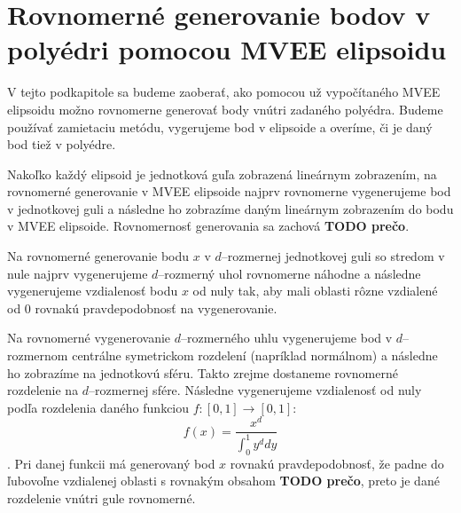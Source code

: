 \section {Rovnomerné generovanie bodov v polyédri pomocou MVEE elipsoidu}

V tejto podkapitole sa budeme zaoberať, ako pomocou už vypočítaného MVEE elipsoidu možno rovnomerne generovať body vnútri zadaného polyédra. Budeme používať zamietaciu metódu, vygerujeme bod v elipsoide a overíme, či je daný bod tiež v polyédre.

Nakoľko každý elipsoid je jednotková guľa zobrazená lineárnym zobrazením, na rovnomerné generovanie v MVEE elipsoide najprv rovnomerne vygenerujeme bod v jednotkovej guli a následne ho zobrazíme daným lineárnym zobrazením do bodu v MVEE elipsoide. Rovnomernosť generovania sa zachová \textbf{TODO prečo}.

Na rovnomerné generovanie bodu $x$ v $d$--rozmernej jednotkovej guli so stredom v nule najprv vygenerujeme $d$--rozmerný uhol rovnomerne náhodne a následne vygenerujeme vzdialenosť bodu $x$ od nuly tak, aby mali oblasti rôzne vzdialené od $0$ rovnakú pravdepodobnosť na vygenerovanie.

Na rovnomerné vygenerovanie $d$--rozmerného uhlu vygenerujeme bod v $d$--rozmernom centrálne symetrickom rozdelení (napríklad normálnom) a následne ho zobrazíme na jednotkovú sféru. Takto zrejme dostaneme rovnomerné rozdelenie na $d$--rozmernej sfére. Následne vygenerujeme vzdialenosť od nuly podľa rozdelenia daného funkciou $f:[0,1] \rightarrow [0,1]$: $$f(x)=\frac{x^d}{\int_0^1 y^d dy}$$.
Pri danej funkcii má generovaný bod $x$ rovnakú pravdepodobnosť, že padne do ľubovoľne vzdialenej oblasti s rovnakým obsahom \textbf{TODO prečo}, preto je dané rozdelenie vnútri gule rovnomerné.